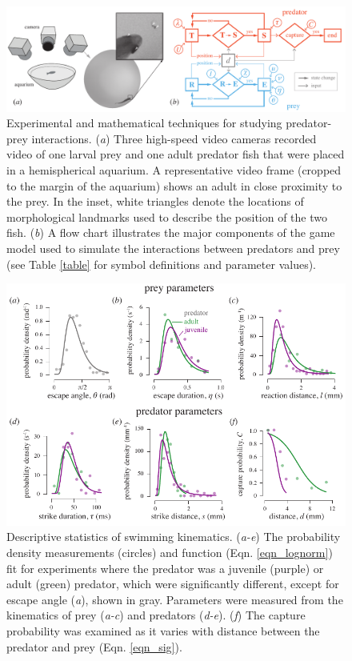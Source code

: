 \documentclass[]{rsos}%
\begin{document}
\pagebreak

\linespread{1}\selectfont %


\begin{figure}[!h]
\centering
	\includegraphics[width=5.5in]{fig_setup}
\caption{Experimental and mathematical techniques for studying predator-prey interactions. 
(\textit{a}) Three high-speed video cameras recorded video of one larval prey and one adult predator fish that were placed in a hemispherical aquarium. 
A representative video frame (cropped to the margin of the aquarium) shows an adult in close proximity to the prey. 
In the inset, white triangles denote the locations of morphological landmarks used to describe the position of the two fish.
 (\textit{b}) A flow chart illustrates the major components of the game model used to simulate the interactions between predators and prey (see Table \ref{table} for symbol definitions and parameter values).}
\label{fig_setup}
\end{figure}

\pagebreak

\begin{figure}[!h]
\centering
	\includegraphics[width=5.5in]{fig_PDFs}
\caption{Descriptive statistics of swimming kinematics. 
(\textit{a-e}) The probability density measurements (circles) and function (Eqn. \ref{eqn_lognorm}) fit for experiments where the predator was a juvenile (purple) or adult (green) predator, which were significantly different, except for escape angle (\textit{a}), shown in gray. 
Parameters were measured from the kinematics of prey (\textit{a-c}) and predators (\textit{d-e}).
(\textit{f}) The capture probability was examined as it varies with distance between the predator and prey (Eqn. \ref{eqn_sig}).  
}
\label{fig_PDF}
\end{figure}
\end{document}
